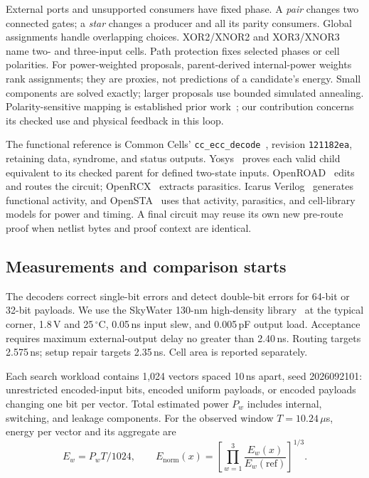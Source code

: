 \documentclass[conference,10pt]{IEEEtran}
\begin{document}
External ports and unsupported consumers have fixed phase. A \emph{pair} changes two connected gates; a \emph{star} changes a producer and all its parity consumers. Global assignments handle overlapping choices. XOR2/XNOR2 and XOR3/XNOR3 name two- and three-input cells. Path protection fixes selected phases or cell polarities. For power-weighted proposals, parent-derived internal-power weights rank assignments; they are proxies, not predictions of a candidate's energy. Small components are solved exactly; larger proposals use bounded simulated annealing. Polarity-sensitive mapping is established prior work~\cite{phase}; our contribution concerns its checked use and physical feedback in this loop.

The functional reference is Common Cells' \texttt{cc\_ecc\_decode}~\cite{commoncells}, revision \texttt{121182ea}, retaining data, syndrome, and status outputs. Yosys~\cite{yosys} proves each valid child equivalent to its checked parent for defined two-state inputs. OpenROAD~\cite{openroad} edits and routes the circuit; OpenRCX~\cite{openrcx} extracts parasitics. Icarus Verilog~\cite{icarus} generates functional activity, and OpenSTA~\cite{opensta} uses that activity, parasitics, and cell-library models for power and timing. A final circuit may reuse its own new pre-route proof when netlist bytes and proof context are identical.
\subsection{Measurements and comparison starts}



The decoders correct single-bit errors and detect double-bit errors for 64-bit or 32-bit payloads. We use the SkyWater 130-nm high-density library~\cite{sky130} at the typical corner, 1.8\,V and 25\,$^\circ$C, 0.05\,ns input slew, and 0.005\,pF output load. Acceptance requires maximum external-output delay no greater than 2.40\,ns. Routing targets 2.575\,ns; setup repair targets 2.35\,ns. Cell area is reported separately.

Each search workload contains 1,024 vectors spaced 10\,ns apart, seed 2026092101: unrestricted encoded-input bits, encoded uniform payloads, or encoded payloads changing one bit per vector. Total estimated power $P_w$ includes internal, switching, and leakage components. For the observed window $T=10.24\,\mu$s, energy per vector and its aggregate are
\begin{equation}
 E_w=P_wT/1024,\qquad
 E_{\mathrm{norm}}(x)=\left[\prod_{w=1}^{3}\frac{E_w(x)}{E_w(\mathrm{ref})}\right]^{1/3}.
 \label{eq:energy}
\end{equation}
\end{document}
